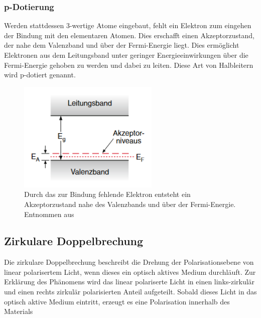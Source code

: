              \FloatBarrier



            \subsubsection*{p-Dotierung}
            Werden stattdessen 3-wertige Atome eingebaut, fehlt ein Elektron zum eingehen der Bindung mit den elementaren Atomen. Dies erschafft einen Akzeptorzustand, der nahe dem Valenzband und über der 
            Fermi-Energie liegt. Dies ermöglicht Elektronen aus dem Leitungsband unter geringer Energieeinwirkungen über die Fermi-Energie gehoben zu werden und dabei zu leiten. Diese Art von Halbleitern wird 
            p-dotiert genannt.

            \FloatBarrier

            \begin{figure}[h]
                \centering
                \includegraphics[width = 0.6\textwidth]{pictures/akzeptor.png}
                \caption{Durch das zur Bindung fehlende Elektron entsteht ein Akzeptorzustand nahe des Valenzbands und über der Fermi-Energie. Entnommen aus \cite{demtroder_atome_2016}}
                \label{fig:Akzeptor}
            \end{figure}
    
            \FloatBarrier


    \subsection{Zirkulare Doppelbrechung}
        Die zirkulare Doppelbrechung beschreibt die Drehung der Polarisationsebene von linear polarisertem Licht, wenn dieses ein optisch aktives Medium durchläuft. Zur Erklärung des Phänomens wird das linear 
        polariserte Licht in einen links-zirkulär und einen rechts zirkulär polarisierten Anteil aufgeteilt. Sobald dieses Licht in das optisch aktive Medium eintritt, erzeugt es eine Polarisation
        innerhalb des Materials

